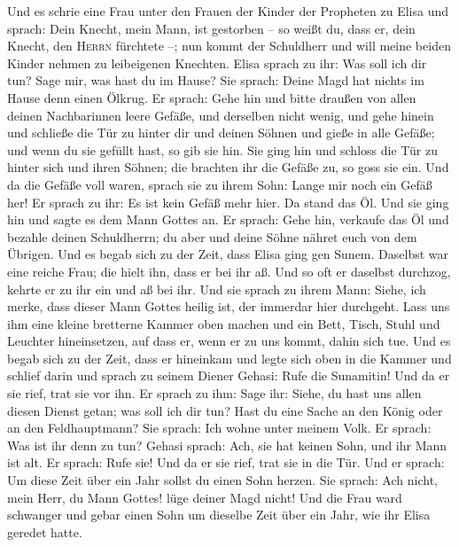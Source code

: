  Und es schrie eine Frau unter den Frauen der Kinder der
Propheten zu Elisa und sprach: Dein Knecht, mein Mann, ist gestorben --
so weißt du, dass er, dein Knecht, den \textsc{Herrn} fürchtete --; nun
kommt der Schuldherr und will meine beiden Kinder nehmen zu leibeigenen
Knechten.  Elisa sprach zu ihr: Was soll ich dir tun? Sage
mir, was hast du im Hause? Sie sprach: Deine Magd hat nichts im Hause
denn einen Ölkrug.  Er sprach: Gehe hin und bitte draußen
von allen deinen Nachbarinnen leere Gefäße, und derselben nicht wenig,
 und gehe hinein und schließe die Tür zu hinter dir und
deinen Söhnen und gieße in alle Gefäße; und wenn du sie gefüllt hast, so
gib sie hin.  Sie ging hin und schloss die Tür zu hinter
sich und ihren Söhnen; die brachten ihr die Gefäße zu, so goss sie ein.
 Und da die Gefäße voll waren, sprach sie zu ihrem Sohn:
Lange mir noch ein Gefäß her! Er sprach zu ihr: Es ist kein Gefäß mehr
hier. Da stand das Öl.  Und sie ging hin und sagte es dem
Mann Gottes an. Er sprach: Gehe hin, verkaufe das Öl und bezahle deinen
Schuldherrn; du aber und deine Söhne nähret euch von dem Übrigen.
 Und es begab sich zu der Zeit, dass Elisa ging gen Sunem.
Daselbst war eine reiche Frau; die hielt ihn, dass er bei ihr aß. Und so
oft er daselbst durchzog, kehrte er zu ihr ein und aß bei ihr.
 Und sie sprach zu ihrem Mann: Siehe, ich merke, dass
dieser Mann Gottes heilig ist, der immerdar hier durchgeht.
 Lass uns ihm eine kleine bretterne Kammer oben machen
und ein Bett, Tisch, Stuhl und Leuchter hineinsetzen, auf dass er, wenn
er zu uns kommt, dahin sich tue.  Und es begab sich zu
der Zeit, dass er hineinkam und legte sich oben in die Kammer und
schlief darin  und sprach zu seinem Diener Gehasi: Rufe
die Sunamitin! Und da er sie rief, trat sie vor ihn.  Er
sprach zu ihm: Sage ihr: Siehe, du hast uns allen diesen Dienst getan;
was soll ich dir tun? Hast du eine Sache an den König oder an den
Feldhauptmann? Sie sprach: Ich wohne unter meinem Volk. 
Er sprach: Was ist ihr denn zu tun? Gehasi sprach: Ach, sie hat keinen
Sohn, und ihr Mann ist alt.  Er sprach: Rufe sie! Und da
er sie rief, trat sie in die Tür.  Und er sprach: Um
diese Zeit über ein Jahr sollst du einen Sohn herzen. Sie sprach: Ach
nicht, mein Herr, du Mann Gottes! lüge deiner Magd nicht!
 Und die Frau ward schwanger und gebar einen Sohn um
dieselbe Zeit über ein Jahr, wie ihr Elisa geredet hatte.
